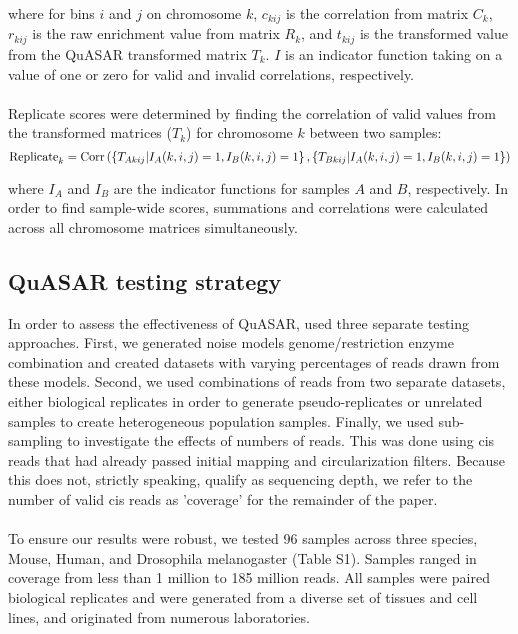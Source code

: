 where for bins $i$ and $j$ on chromosome $k$, $c_{kij}$ is the correlation from matrix $C_k$, $r_{kij}$ is the raw enrichment value from matrix $R_k$, and $t_{kij}$ is the transformed value from the QuASAR transformed matrix $T_k$. $I$ is an indicator function taking on a value of one or zero for valid and invalid correlations, respectively.
\\\\
Replicate scores were determined by finding the correlation of valid values from the transformed matrices ($T_k$) for chromosome $k$ between two samples:
\[\textnormal{Replicate}_{k}=\textnormal{Corr}\left(\left\{T_{Akij}|I_A(k,i,j)=1,I_B(k,i,j)=1\right\},\left\{T_{Bkij}|I_A(k,i,j)=1,I_B(k,i,j)=1\right\}\right)\]

where $I_A$ and $I_B$ are the indicator functions for samples $A$ and $B$, respectively. In order to find sample-wide scores, summations and correlations were calculated across all chromosome matrices simultaneously.


\subsection{QuASAR testing strategy}

In order to assess the effectiveness of QuASAR, used three separate testing approaches. First, we generated noise models genome/restriction enzyme combination and created datasets with varying percentages of reads drawn from these models. Second, we used combinations of reads from two separate datasets, either biological replicates in order to generate pseudo-replicates or unrelated samples to create heterogeneous population samples. Finally, we used sub-sampling to investigate the effects of numbers of reads. This was done using cis reads that had already passed initial mapping and circularization filters. Because this does not, strictly speaking, qualify as sequencing depth, we refer to the number of valid cis reads as 'coverage' for the remainder of the paper.
\\\\
To ensure our results were robust, we tested 96 samples across three species, Mouse, Human, and Drosophila melanogaster (Table S1). Samples ranged in coverage from less than 1 million to 185 million reads. All samples were paired biological replicates and were generated from a diverse set of tissues and cell lines, and originated from numerous laboratories. 

